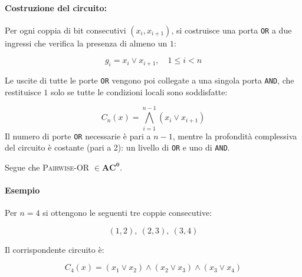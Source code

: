 \documentclass[a4paper,12pt]{report}
\theoremstyle{propositionstyle}
\begin{document}
    \paragraph{Costruzione del circuito:}

    Per ogni coppia di bit consecutivi $(x_i, x_{i+1})$, si costruisce una porta \texttt{OR} a due ingressi che verifica la presenza di almeno un $1$:

    \[
        g_i = x_i \vee x_{i+1}, \quad 1 \leq i < n
    \]

    Le uscite di tutte le porte \texttt{OR} vengono poi collegate a una singola porta \texttt{AND}, che restituisce $1$ solo se tutte le condizioni locali sono soddisfatte:

    \[
        C_n(x) = \bigwedge_{i=1}^{n-1} (x_i \vee x_{i+1})
    \]
    Il numero di porte \texttt{OR} necessarie è pari a $n-1$, mentre la profondità complessiva del circuito è costante (pari a 2): un livello di \texttt{OR} e uno di \texttt{AND}.

    Segue che \textsc{Pairwise-OR} $\in \mathbf{AC^0}$.

    \paragraph{Esempio}

    Per $n = 4$ si ottengono le seguenti tre coppie consecutive:

    \[
        (1,2),\ (2,3),\ (3,4)
    \]

    Il corrispondente circuito è:

    \[
        C_4(x) = (x_1 \vee x_2) \wedge (x_2 \vee x_3) \wedge (x_3 \vee x_4)
    \]
\end{document}
